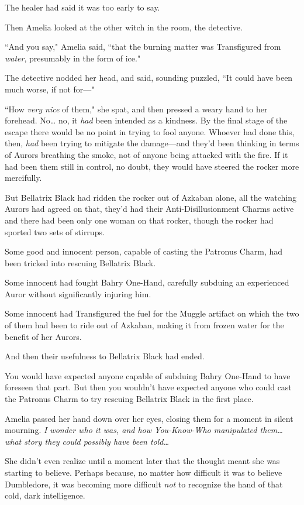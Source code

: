 The healer had said it was too early to say.

Then Amelia looked at the other witch in the room, the detective.

``And you say," Amelia said, ``that the burning matter was Transfigured from \emph{water}, presumably in the form of ice."

The detective nodded her head, and said, sounding puzzled, ``It could have been much worse, if not for---"

``How \emph{very nice} of them," she spat, and then pressed a weary hand to her forehead. No{\ldots} no, it \emph{had} been intended as a kindness. By the final stage of the escape there would be no point in trying to fool anyone. Whoever had done this, then, \emph{had} been trying to mitigate the damage---and they'd been thinking in terms of Aurors breathing the smoke, not of anyone being attacked with the fire. If it had been them still in control, no doubt, they would have steered the rocker more mercifully.

But Bellatrix Black had ridden the rocker out of Azkaban alone, all the watching Aurors had agreed on that, they'd had their Anti-Disillusionment Charms active and there had been only one woman on that rocker, though the rocker had sported two sets of stirrups.

Some good and innocent person, capable of casting the Patronus Charm, had been tricked into rescuing Bellatrix Black.

Some innocent had fought Bahry One-Hand, carefully subduing an experienced Auror without significantly injuring him.

Some innocent had Transfigured the fuel for the Muggle artifact on which the two of them had been to ride out of Azkaban, making it from frozen water for the benefit of her Aurors.

And then their usefulness to Bellatrix Black had ended.

You would have expected anyone capable of subduing Bahry One-Hand to have foreseen that part. But then you wouldn't have expected anyone who could cast the Patronus Charm to try rescuing Bellatrix Black in the first place.

Amelia passed her hand down over her eyes, closing them for a moment in silent mourning. \emph{I wonder who it was, and how You-Know-Who manipulated them{\ldots} what story they could \emph{possibly} have been told{\ldots}}

She didn't even realize until a moment later that the thought meant she was starting to believe. Perhaps because, no matter how difficult it was to believe Dumbledore, it was becoming more difficult \emph{not} to recognize the hand of that cold, dark intelligence.

